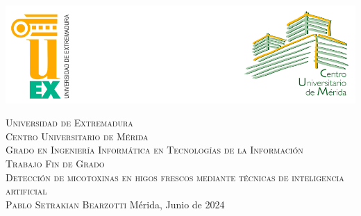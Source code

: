 \pagestyle{empty}



\begin{center}
	\newcommand{\HRule}{\rule{\linewidth}{0.7mm}}
	\begin{center}
            \includegraphics[width=\columnwidth, keepaspectratio]{images/logo.png}\\
        \end{center}

	\vspace*{2cm}
	\textsc{\large Universidad de Extremadura}\\[0.5cm]
	\textsc{\large Centro Universitario de Mérida}\\[1.3cm]
	\textsc{\LARGE Grado en Ingeniería Informática en Tecnologías de la Información}\\[1.3cm]
	\textsc{\huge Trabajo Fin de Grado}\\[2cm]
	\textsc{\LARGE Detección de micotoxinas en higos frescos mediante técnicas de inteligencia artificial }\\[1.5 cm]
	
	\textsc{\large Pablo Setrakian Bearzotti}
	\vspace{2cm} 
	\vfill
	Mérida, Junio de 2024
\end{center}
